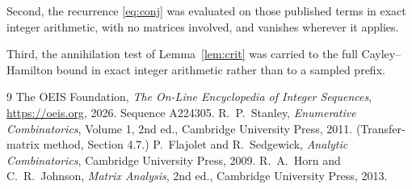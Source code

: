 \documentclass[11pt,a4paper]{article}
\theoremstyle{plain}
\theoremstyle{definition}
\begin{document}
Second, the recurrence \eqref{eq:conj} was evaluated on those published terms in exact
integer arithmetic, with no matrices involved, and vanishes wherever it applies.

Third, the annihilation test of Lemma~\ref{lem:crit} was carried to the full
Cayley--Hamilton bound in exact integer arithmetic rather than to a sampled prefix.

\begin{thebibliography}{9}
 The OEIS Foundation, \emph{The On-Line Encyclopedia of Integer
Sequences}, \url{https://oeis.org}, 2026. Sequence A224305.
 R.~P.~Stanley, \emph{Enumerative Combinatorics}, Volume 1, 2nd ed.,
Cambridge University Press, 2011. (Transfer-matrix method, Section 4.7.)
 P.~Flajolet and R.~Sedgewick, \emph{Analytic Combinatorics}, Cambridge
University Press, 2009.
 R.~A.~Horn and C.~R.~Johnson, \emph{Matrix Analysis}, 2nd ed., Cambridge
University Press, 2013.
\end{thebibliography}
\end{document}
